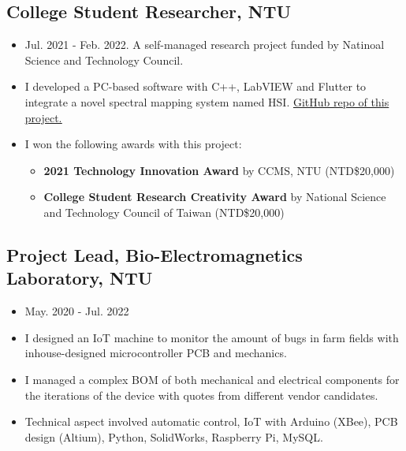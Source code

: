 \documentclass[12pt]{article}
\begin{document}
        \subsection*{College Student Researcher, NTU}
        {\sffamily
        \begin{itemize}
            \item Jul. 2021 - Feb. 2022. A self-managed research project funded by Natinoal Science and Technology Council.
            \item I developed a PC-based software with C++, LabVIEW and Flutter to integrate a novel spectral mapping system named HSI. \href{https://github.com/HyperSpectral-Imaging}{\underline{GitHub repo of this project.}}
            \item I won the following awards with this project: 
            \begin{itemize}
                \item \textbf{2021 Technology Innovation Award} by CCMS, NTU (NTD\$20,000)
                \item \textbf{College Student Research Creativity Award} by National Science and Technology Council of Taiwan (NTD\$20,000)
            \end{itemize}
        \end{itemize}}
        \subsection*{Project Lead, Bio-Electromagnetics Laboratory, NTU}
        {\sffamily
        \begin{itemize}
            \item May. 2020 - Jul. 2022
            \item I designed an IoT machine to monitor the amount of bugs in farm fields with inhouse-designed microcontroller PCB and mechanics.
            \item I managed a complex BOM of both mechanical and electrical components for the iterations of the device with quotes from different vendor candidates.
            \item Technical aspect involved automatic control, IoT with Arduino (XBee), PCB design (Altium), Python, SolidWorks, Raspberry Pi, MySQL.
        \end{itemize}
        }
        
\end{document}
